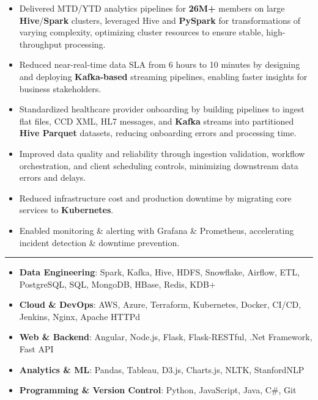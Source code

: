 \documentclass[letterpaper]{article}
\newcommand{\SectionStyle}{\HeadingFont\fontsize{13}{14}\selectfont\bfseries\color{Heading}}
\newcommand{\BodyStyle}{\fontsize{10}{10.5}\selectfont\color{BodyGray}}
\newlength{\SectionTopSpace}\setlength{\SectionTopSpace}{0pt}
\newlength{\SectionRuleGap}\setlength{\SectionRuleGap}{-6pt}
\newlength{\SectionAfterRuleSpace}\setlength{\SectionAfterRuleSpace}{-2pt}
\newlength{\BulletIndent}\setlength{\BulletIndent}{0.208in}
\newlength{\BulletLabelWidth}\setlength{\BulletLabelWidth}{0.10in}
\newlength{\BulletLabelSep}\setlength{\BulletLabelSep}{0.10in}
\newlength{\BulletLeftMargin}\setlength{\BulletLeftMargin}{\BulletIndent}
\newcommand{\SkillListStart}{\begin{itemize}[leftmargin=\BulletLeftMargin,labelsep=\BulletLabelSep,labelwidth=\BulletLabelWidth,itemsep=2pt,topsep=0pt,parsep=0pt,partopsep=0pt,align=parleft]}
\newcommand{\BulletListEnd}{\end{itemize}}
\newcommand{\BulletItem}[1]{\item #1}
\newlength{\SectionIndent}\setlength{\SectionIndent}{0in}
\newcommand{\SectionHeading}[1]{\vspace{\SectionTopSpace}\noindent\hspace*{-\SectionIndent}{\SectionStyle #1}\par\vspace{\SectionRuleGap}\noindent\hspace*{-\SectionIndent}\color{RuleGray}\rule{\dimexpr\linewidth+\SectionIndent\relax}{0.4pt}\color{Heading}\vspace{\SectionAfterRuleSpace}}
\newlength{\ExpIndent}\setlength{\ExpIndent}{0in}
\newlength{\ExpContentW}\setlength{\ExpContentW}{\dimexpr\textwidth-\ExpIndent\relax}
\newcommand{\ExpBulletListStart}{\begin{itemize}[leftmargin=\BulletLeftMargin,labelsep=\BulletLabelSep,labelwidth=\BulletLabelWidth,itemsep=-1pt,topsep=0pt,parsep=0pt,partopsep=0pt,align=parleft]}
\newlength{\ExpB}\setlength{\ExpB}{0.20177\ExpContentW}
\begin{document}
\vspace{0pt}
\begin{minipage}{\textwidth}
  \ExpBulletListStart
    \BulletItem{{\BodyStyle Delivered MTD/YTD analytics pipelines for \textbf{26M+} members on large \textbf{Hive}/\textbf{Spark} clusters, leveraged Hive and \textbf{PySpark} for transformations of varying complexity, optimizing cluster resources to ensure stable, high-throughput processing.}}
    \BulletItem{{\BodyStyle Reduced near-real-time data SLA from 6 hours to 10 minutes by designing and deploying \textbf{Kafka-based} streaming pipelines, enabling faster insights for business stakeholders.}}
    \BulletItem{{\BodyStyle Standardized healthcare provider onboarding by building pipelines to ingest flat files, CCD XML, HL7 messages, and \textbf{Kafka} streams into partitioned \textbf{Hive Parquet} datasets, reducing onboarding errors and processing time.}}
    \BulletItem{{\BodyStyle Improved data quality and reliability through ingestion validation, workflow orchestration, and client scheduling controls, minimizing downstream data errors and delays.}}
    \BulletItem{{\BodyStyle Reduced infrastructure cost and production downtime by migrating core services to \textbf{Kubernetes}.}}
    \BulletItem{{\BodyStyle Enabled monitoring \& alerting with Grafana \& Prometheus, accelerating incident detection \& downtime prevention.}}
  \BulletListEnd
\end{minipage}

\vspace{0pt}

{\SectionHeading{SKILLS}}
\begin{minipage}{\textwidth}
  \SkillListStart
    \BulletItem{{\BodyStyle \textbf{Data Engineering}: Spark, Kafka, Hive, HDFS, Snowflake, Airflow, ETL, PostgreSQL, SQL, MongoDB, HBase, Redis, KDB+}}
    \BulletItem{{\BodyStyle \textbf{Cloud \& DevOps}: AWS, Azure, Terraform, Kubernetes, Docker, CI/CD, Jenkins, Nginx, Apache HTTPd}}
    \BulletItem{{\BodyStyle \textbf{Web \& Backend}: Angular, Node.js, Flask, Flask-RESTful, .Net Framework, Fast API}}
    \BulletItem{{\BodyStyle \textbf{Analytics \& ML}: Pandas, Tableau, D3.js, Charts.js, NLTK, StanfordNLP}}
    \BulletItem{{\BodyStyle \textbf{Programming \& Version Control}: Python, JavaScript, Java, C\#, Git}}
  \BulletListEnd
\end{minipage}
\end{document}
